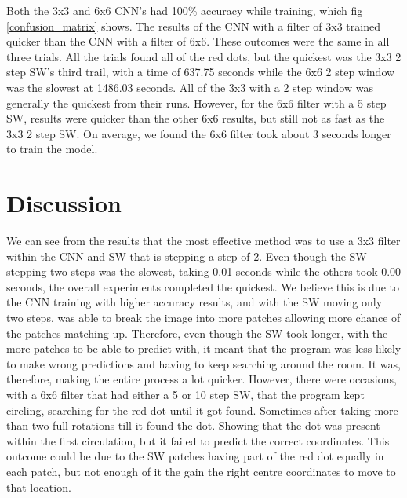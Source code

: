 \documentclass[a4paper,10pt]{article}
\begin{document}
Both the 3x3 and 6x6 CNN's had 100\% accuracy while training, which fig \ref{confusion_matrix} shows. The results of the CNN with a filter of 3x3 trained quicker than the CNN with a filter of 6x6. These outcomes were the same in all three trials. All the trials found all of the red dots, but the quickest was the 3x3 2 step SW's third trail, with a time of 637.75 seconds while the 6x6 2 step window was the slowest at 1486.03 seconds. All of the 3x3 with a 2 step window was generally the quickest from their runs. However, for the 6x6 filter with a 5 step SW, results were quicker than the other 6x6 results, but still not as fast as the 3x3 2 step SW. On average, we found the 6x6 filter took about 3 seconds longer to train the model.

\section{Discussion}

We can see from the results that the most effective method was to use a 3x3 filter within the CNN and SW that is stepping a step of 2. Even though the SW stepping two steps was the slowest, taking 0.01 seconds while the others took 0.00 seconds, the overall experiments completed the quickest. We believe this is due to the CNN training with higher accuracy results, and with the SW moving only two steps, was able to break the image into more patches allowing more chance of the patches matching up. Therefore, even though the SW took longer, with the more patches to be able to predict with, it meant that the program was less likely to make wrong predictions and having to keep searching around the room. It was, therefore, making the entire process a lot quicker. However, there were occasions, with a 6x6 filter that had either a 5 or 10 step SW, that the program kept circling, searching for the red dot until it got found. Sometimes after taking more than two full rotations till it found the dot. Showing that the dot was present within the first circulation, but it failed to predict the correct coordinates. This outcome could be due to the SW patches having part of the red dot equally in each patch, but not enough of it the gain the right centre coordinates to move to that location.
\end{document}

